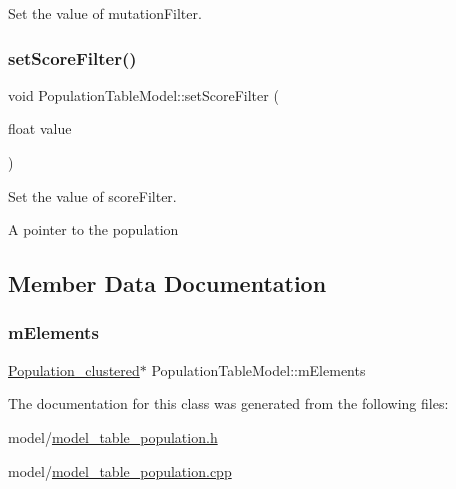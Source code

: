 Set the value of mutation\+Filter. 

\mbox{\label{class_population_table_model_a001b0d530f0cad81a919667a3b3575f8}} 
\subsubsection{\texorpdfstring{set\+Score\+Filter()}{setScoreFilter()}}
{\footnotesize\ttfamily void Population\+Table\+Model\+::set\+Score\+Filter (\begin{DoxyParamCaption}\item[{float}]{value }\end{DoxyParamCaption})}



Set the value of score\+Filter. 

A pointer to the population 

\subsection{Member Data Documentation}
\mbox{\label{class_population_table_model_a3ee2ae16c64538e01d221f89da1fdc40}} 
\subsubsection{\texorpdfstring{m\+Elements}{mElements}}
{\footnotesize\ttfamily \hyperlink{class_population__clustered}{Population\+\_\+clustered}$\ast$ Population\+Table\+Model\+::m\+Elements}



The documentation for this class was generated from the following files\+:\begin{DoxyCompactItemize}
\item 
model/\hyperlink{model__table__population_8h}{model\+\_\+table\+\_\+population.\+h}\item 
model/\hyperlink{model__table__population_8cpp}{model\+\_\+table\+\_\+population.\+cpp}\end{DoxyCompactItemize}
